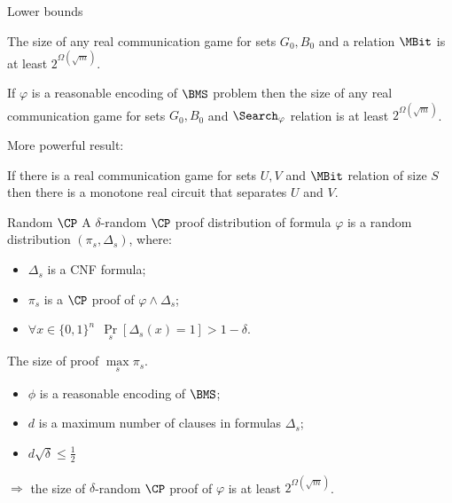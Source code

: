\begin{frame}{Lower bounds}


    \begin{theorem}
        The size of any real communication game for sets $G_0, B_0$ and a relation $\MBit$ is at least $2^{\Omega(\sqrt{m})}$.

        If $\varphi$ is a reasonable encoding of $\BMS$ problem then the size of any real communication game for sets $G_0,
        B_0$ and $\Search_{\varphi}$ relation is at least $2^{\Omega(\sqrt{m})}$.
    \end{theorem}

    \pause
    More powerful result:
    \begin{theorem}
        If there is a real communication game for sets $U, V$ and $\MBit$ relation of size $S$ then there
        is a monotone real circuit that separates $U$ and $V$.
    \end{theorem}
\end{frame}


\begin{frame}{Random $\CP$}
    A $\delta$-random $\CP$ proof distribution of formula $\varphi$ is a random distribution $(\pi_s,
    \Delta_s)$, where:
    \begin{itemize}
        \item $\Delta_s$ is a CNF formula;
        \item $\pi_s$ is a $\CP$ proof of $\varphi \land \Delta_s$;
        \item $\forall x \in \{0, 1\}^n ~~ \Pr\limits_s[\Delta_s(x) = 1] > 1 - \delta$.
    \end{itemize}

    The size of proof $\max\limits_s \pi_s$.
    \pause

    \begin{theorem}
        \begin{itemize}
            \item $\phi$ is a reasonable encoding of $\BMS$;
            \item $d$ is a maximum number of clauses in formulas $\Delta_s$;
            \item $d \sqrt{\delta} \le \frac{1}{2}$
        \end{itemize}
        $\Rightarrow$ the size of $\delta$-random $\CP$ proof of $\varphi$ is at least
        $2^{\Omega(\sqrt{m})}$.
    \end{theorem}
\end{frame}


